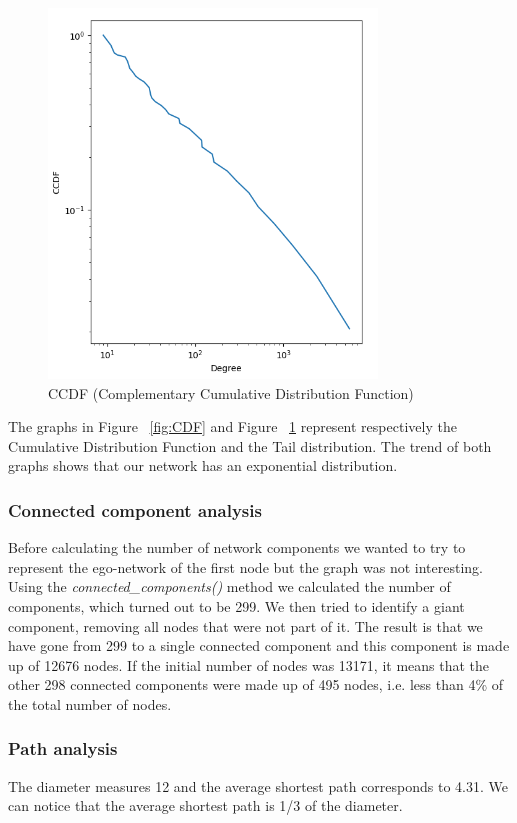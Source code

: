\documentclass[sigchi]{acmart}
\begin{document}
\begin{figure}[hbpt]
  \centering
  \includegraphics[width=0.8\linewidth]{img/degree_CCDF.png}
  \caption{CCDF (Complementary Cumulative Distribution Function)}
  \label{fig:CCDF}
\end{figure}

\noindent The graphs in Figure ~\ref{fig:CDF} and Figure ~\ref{fig:CCDF} represent respectively the Cumulative Distribution Function and the Tail distribution. The trend of both graphs shows that our network has an exponential distribution.

\subsubsection{Connected component analysis}  Before calculating the number of network components we wanted to try to represent the ego-network of the first node but the graph was not interesting.
Using the \textit{connected\_components()} method we calculated the number of components, which turned out to be 299. We then tried to identify a giant component, removing all nodes that were not part of it. The result is that we have gone from 299 to a single connected component and this component is made up of 12676 nodes. If the initial number of nodes was 13171, it means that the other 298 connected components were made up of 495 nodes, i.e. less than 4\% of the total number of nodes.

\subsubsection{Path analysis} The diameter measures 12 and the average shortest path corresponds to 4.31. We can notice that the average shortest path is 1/3 of the diameter.
\end{document}
